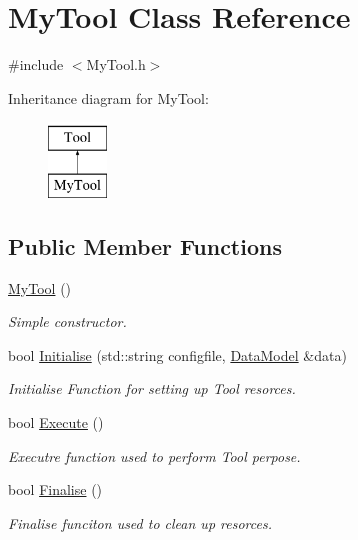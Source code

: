 \hypertarget{classMyTool}{\section{My\-Tool Class Reference}
\label{classMyTool}
}


{\ttfamily \#include $<$My\-Tool.\-h$>$}

Inheritance diagram for My\-Tool\-:\begin{figure}[H]
\begin{center}
\leavevmode
\includegraphics[height=2.000000cm]{classMyTool}
\end{center}
\end{figure}
\subsection*{Public Member Functions}
\begin{DoxyCompactItemize}
\item 
\hypertarget{classMyTool_ad85b796bdd675ae22e69cf40fe7b6314}{\hyperlink{classMyTool_ad85b796bdd675ae22e69cf40fe7b6314}{My\-Tool} ()}\label{classMyTool_ad85b796bdd675ae22e69cf40fe7b6314}

\begin{DoxyCompactList}\small\item\em Simple constructor. \end{DoxyCompactList}\item 
bool \hyperlink{classMyTool_a3bf60061195a18542c4cfb2916b9dad9}{Initialise} (std\-::string configfile, \hyperlink{classDataModel}{Data\-Model} \&data)
\begin{DoxyCompactList}\small\item\em Initialise Function for setting up Tool resorces. \end{DoxyCompactList}\item 
\hypertarget{classMyTool_a0a58122023af90b9200d0e71e89cfb36}{bool \hyperlink{classMyTool_a0a58122023af90b9200d0e71e89cfb36}{Execute} ()}\label{classMyTool_a0a58122023af90b9200d0e71e89cfb36}

\begin{DoxyCompactList}\small\item\em Executre function used to perform Tool perpose. \end{DoxyCompactList}\item 
\hypertarget{classMyTool_a060ec6356451aa335d0de41093c9992f}{bool \hyperlink{classMyTool_a060ec6356451aa335d0de41093c9992f}{Finalise} ()}\label{classMyTool_a060ec6356451aa335d0de41093c9992f}

\begin{DoxyCompactList}\small\item\em Finalise funciton used to clean up resorces. \end{DoxyCompactList}\end{DoxyCompactItemize}


